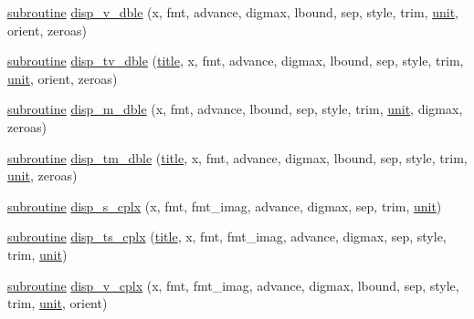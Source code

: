\begin{DoxyCompactItemize}
\item 
\hyperlink{M__stopwatch_83_8txt_acfbcff50169d691ff02d4a123ed70482}{subroutine} \hyperlink{interfacem__display_1_1disp_a35a6122020ddabd90eeae95615317063}{disp\+\_\+v\+\_\+dble} (x, fmt, advance, digmax, lbound, sep, style, trim, \hyperlink{M__stopwatch_83_8txt_a5cbef30eb7c0d734bd82f5a7ebea9aa7}{unit}, orient, zeroas)
\item 
\hyperlink{M__stopwatch_83_8txt_acfbcff50169d691ff02d4a123ed70482}{subroutine} \hyperlink{interfacem__display_1_1disp_a7be4c3ed3a7ad3e91eeb650764e4f646}{disp\+\_\+tv\+\_\+dble} (\hyperlink{print__watch_83_8txt_a15b5bd21156bb9fca6a755ab8c029a9c}{title}, x, fmt, advance, digmax, lbound, sep, style, trim, \hyperlink{M__stopwatch_83_8txt_a5cbef30eb7c0d734bd82f5a7ebea9aa7}{unit}, orient, zeroas)
\item 
\hyperlink{M__stopwatch_83_8txt_acfbcff50169d691ff02d4a123ed70482}{subroutine} \hyperlink{interfacem__display_1_1disp_ac0adef7e3feae712c5b768178afe5a09}{disp\+\_\+m\+\_\+dble} (x, fmt, advance, lbound, sep, style, trim, \hyperlink{M__stopwatch_83_8txt_a5cbef30eb7c0d734bd82f5a7ebea9aa7}{unit}, digmax, zeroas)
\item 
\hyperlink{M__stopwatch_83_8txt_acfbcff50169d691ff02d4a123ed70482}{subroutine} \hyperlink{interfacem__display_1_1disp_af2aaa3b602a70392f3bf3b8195d459a5}{disp\+\_\+tm\+\_\+dble} (\hyperlink{print__watch_83_8txt_a15b5bd21156bb9fca6a755ab8c029a9c}{title}, x, fmt, advance, digmax, lbound, sep, style, trim, \hyperlink{M__stopwatch_83_8txt_a5cbef30eb7c0d734bd82f5a7ebea9aa7}{unit}, zeroas)
\item 
\hyperlink{M__stopwatch_83_8txt_acfbcff50169d691ff02d4a123ed70482}{subroutine} \hyperlink{interfacem__display_1_1disp_a20cbed617de63d5b8e89ed9de7d78215}{disp\+\_\+s\+\_\+cplx} (x, fmt, fmt\+\_\+imag, advance, digmax, sep, trim, \hyperlink{M__stopwatch_83_8txt_a5cbef30eb7c0d734bd82f5a7ebea9aa7}{unit})
\item 
\hyperlink{M__stopwatch_83_8txt_acfbcff50169d691ff02d4a123ed70482}{subroutine} \hyperlink{interfacem__display_1_1disp_a2c31dc8b8a8b8f03f8c69bb09be4973d}{disp\+\_\+ts\+\_\+cplx} (\hyperlink{print__watch_83_8txt_a15b5bd21156bb9fca6a755ab8c029a9c}{title}, x, fmt, fmt\+\_\+imag, advance, digmax, sep, style, trim, \hyperlink{M__stopwatch_83_8txt_a5cbef30eb7c0d734bd82f5a7ebea9aa7}{unit})
\item 
\hyperlink{M__stopwatch_83_8txt_acfbcff50169d691ff02d4a123ed70482}{subroutine} \hyperlink{interfacem__display_1_1disp_ad63e247441071b54d752210cac745522}{disp\+\_\+v\+\_\+cplx} (x, fmt, fmt\+\_\+imag, advance, digmax, lbound, sep, style, trim, \hyperlink{M__stopwatch_83_8txt_a5cbef30eb7c0d734bd82f5a7ebea9aa7}{unit}, orient)

\end{DoxyCompactItemize}
